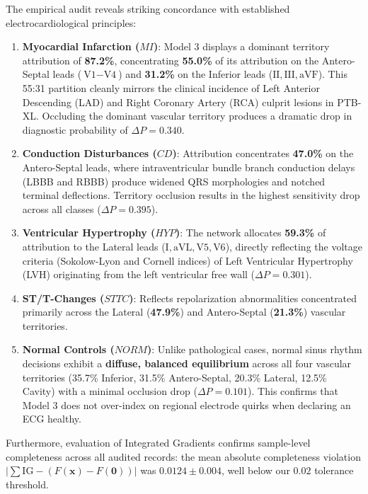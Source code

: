 \documentclass[12pt]{elsarticle}
\begin{document}
The empirical audit reveals striking concordance with established electrocardiological principles:
\begin{enumerate}
    \item \textbf{Myocardial Infarction ($MI$)}: Model 3 displays a dominant territory attribution of \textbf{87.2\%}, concentrating \textbf{55.0\%} of its attribution on the Antero-Septal leads ($\text{V1}-\text{V4}$) and \textbf{31.2\%} on the Inferior leads ($\text{II}, \text{III}, \text{aVF}$). This 55:31 partition cleanly mirrors the clinical incidence of Left Anterior Descending (LAD) and Right Coronary Artery (RCA) culprit lesions in PTB-XL. Occluding the dominant vascular territory produces a dramatic drop in diagnostic probability of $\Delta P = \mathbf{0.340}$.
    \item \textbf{Conduction Disturbances ($CD$)}: Attribution concentrates \textbf{47.0\%} on the Antero-Septal leads, where intraventricular bundle branch conduction delays (LBBB and RBBB) produce widened QRS morphologies and notched terminal deflections. Territory occlusion results in the highest sensitivity drop across all classes ($\Delta P = \mathbf{0.395}$).
    \item \textbf{Ventricular Hypertrophy ($HYP$)}: The network allocates \textbf{59.3\%} of attribution to the Lateral leads ($\text{I}, \text{aVL}, \text{V5}, \text{V6}$), directly reflecting the voltage criteria (Sokolow-Lyon and Cornell indices) of Left Ventricular Hypertrophy (LVH) originating from the left ventricular free wall ($\Delta P = \mathbf{0.301}$).
    \item \textbf{ST/T-Changes ($STTC$)}: Reflects repolarization abnormalities concentrated primarily across the Lateral (\textbf{47.9\%}) and Antero-Septal (\textbf{21.3\%}) vascular territories.
    \item \textbf{Normal Controls ($NORM$)}: Unlike pathological cases, normal sinus rhythm decisions exhibit a \textbf{diffuse, balanced equilibrium} across all four vascular territories (35.7\% Inferior, 31.5\% Antero-Septal, 20.3\% Lateral, 12.5\% Cavity) with a minimal occlusion drop ($\Delta P = 0.101$). This confirms that Model 3 does not over-index on regional electrode quirks when declaring an ECG healthy.
\end{enumerate}

Furthermore, evaluation of Integrated Gradients confirms sample-level completeness across all audited records: the mean absolute completeness violation $|\sum \text{IG} - (F(\mathbf{x}) - F(\mathbf{0}))|$ was $0.0124 \pm 0.004$, well below our $0.02$ tolerance threshold.
\end{document}
